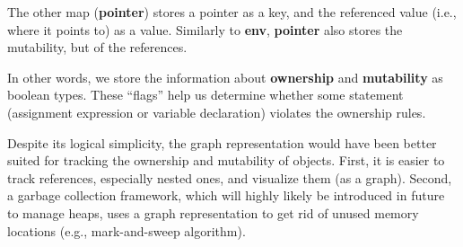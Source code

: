 The other map (\textbf{pointer}) stores a pointer as a key, and the referenced value (i.e., where it points to) as a value. Similarly to \textbf{env}, \textbf{pointer} also stores
the mutability, but of the references.

In other words, we store the information about \textbf{ownership} and
\textbf{mutability} as boolean types. These ``flags'' help us determine
whether some statement (assignment expression or variable declaration) violates
the ownership rules.

Despite its logical simplicity, the graph representation would have been better
suited for tracking the ownership and mutability of objects. First, it is easier
to track references, especially nested ones, and visualize them (as a graph).
Second, a garbage collection framework, which will highly likely be introduced in future
to manage heaps, uses a graph representation to get rid of unused memory locations
(e.g., mark-and-sweep algorithm).
